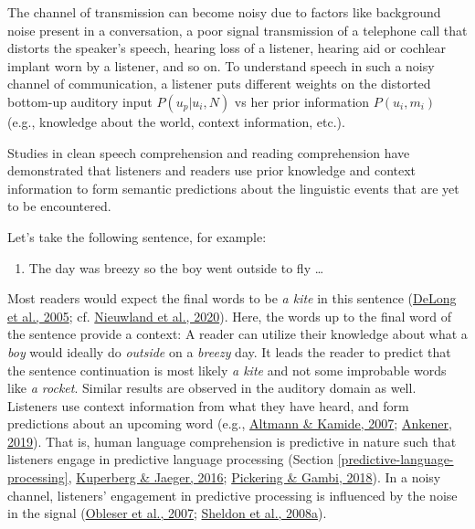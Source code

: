 \documentclass[a4paper, nobind]{templates/ociamthesis}
\providecommand{\tightlist}{%
  \setlength{\itemsep}{0pt}\setlength{\parskip}{0pt}}
\begin{document}
The channel of transmission can become noisy due to factors like background noise present in a conversation,
a poor signal transmission of a telephone call that distorts the speaker's speech,
hearing loss of a listener,
hearing aid or cochlear implant worn by a listener, and so on.
To understand speech in such a noisy channel of communication, a listener puts different weights on the distorted bottom-up auditory input \(P(u_p|u_i, N)\) vs her prior information \(P(u_i, m_i)\) (e.g., knowledge about the world, context information, etc.).

Studies in clean speech comprehension and reading comprehension have demonstrated that listeners and readers use prior knowledge and context information to form semantic predictions about the linguistic events that are yet to be encountered.

Let's take the following sentence, for example:

\begin{enumerate}
\def\labelenumi{(\arabic{enumi})}
\tightlist
\item
  The day was breezy so the boy went outside to fly \ldots{}
\end{enumerate}

Most readers would expect the final words to be \emph{a kite} in this sentence (\protect\hyperlink{ref-Delong2005}{DeLong et al., 2005}; cf. \protect\hyperlink{ref-Nieuwland2020a}{Nieuwland et al., 2020}). Here, the words up to the final word of the sentence provide a context:
A reader can utilize their knowledge about what a \emph{boy} would ideally do \emph{outside} on a \emph{breezy} day.
It leads the reader to predict that the sentence continuation is most likely \emph{a kite} and not some improbable words like \emph{a rocket}.
Similar results are observed in the auditory domain as well.
Listeners use context information from what they have heard, and form predictions about an upcoming word (e.g., \protect\hyperlink{ref-Altmann2007}{Altmann \& Kamide, 2007}; \protect\hyperlink{ref-Ankener2019}{Ankener, 2019}).
That is, human language comprehension is predictive in nature such that listeners engage in predictive language processing (Section \ref{predictive-language-processing}, \protect\hyperlink{ref-Kuperberg2016}{Kuperberg \& Jaeger, 2016}; \protect\hyperlink{ref-Pickering2018}{Pickering \& Gambi, 2018}).
In a noisy channel, listeners' engagement in predictive processing is influenced by the noise in the signal (\protect\hyperlink{ref-Obleser2007}{Obleser et al., 2007}; \protect\hyperlink{ref-Sheldon2008a}{Sheldon et al., 2008a}).
\end{document}
